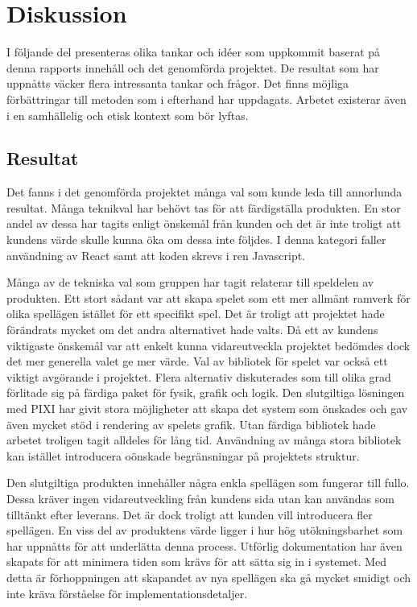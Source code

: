 \chapter{Diskussion}
\label{cha:discussion}

I följande del presenteras olika tankar och idéer som uppkommit baserat på denna rapports innehåll och det genomförda projektet. De resultat som har uppnåtts väcker flera intressanta tankar och frågor. Det finns möjliga förbättringar till metoden som i efterhand har uppdagats. Arbetet existerar även i en samhällelig och etisk kontext som bör lyftas.

\section{Resultat}
\label{sec:discussion-results}

Det fanns i det genomförda projektet många val som kunde leda till annorlunda resultat. Många teknikval har behövt tas för att färdigställa produkten. En stor andel av dessa har tagits enligt önskemål från kunden och det är inte troligt att kundens värde skulle kunna öka om dessa inte följdes. I denna kategori faller användning av React samt att koden skrevs i ren Javascript.

Många av de tekniska val som gruppen har tagit relaterar till speldelen av produkten. Ett stort sådant var att skapa spelet som ett mer allmänt ramverk för olika spellägen istället för ett specifikt spel. Det är troligt att projektet hade förändrats mycket om det andra alternativet hade valts. Då ett av kundens viktigaste önskemål var att enkelt kunna vidareutveckla projektet bedömdes dock det mer generella valet ge mer värde. Val av bibliotek för spelet var också ett viktigt avgörande i projektet. Flera alternativ diskuterades som till olika grad förlitade sig på färdiga paket för fysik, grafik och logik. Den slutgiltiga lösningen med PIXI har givit stora möjligheter att skapa det system som önskades och gav även mycket stöd i rendering av spelets grafik. Utan färdiga bibliotek hade arbetet troligen tagit alldeles för lång tid. Användning av många stora bibliotek kan istället introducera oönskade begränsningar på projektets struktur.

Den slutgiltiga produkten innehåller några enkla spellägen som fungerar till fullo. Dessa kräver ingen vidareutveckling från kundens sida utan kan användas som tilltänkt efter leverans. Det är dock troligt att kunden vill introducera fler spellägen. En viss del av produktens värde ligger i hur hög utökningsbarhet som har uppnåtts för att underlätta denna process. Utförlig dokumentation har även skapats för att minimera tiden som krävs för att sätta sig in i systemet. Med detta är förhoppningen att skapandet av nya spellägen ska gå mycket smidigt och inte kräva förståelse för implementationsdetaljer.

